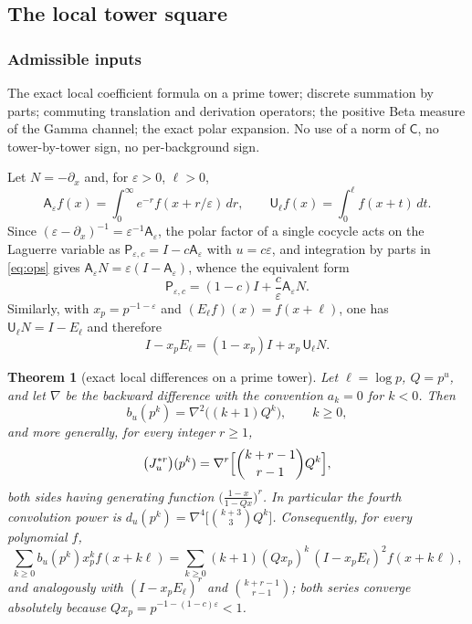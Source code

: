 \documentclass[11pt]{amsart}
\newtheorem{theorem}{Theorem}[section]
\theoremstyle{definition}
\theoremstyle{remark}
\theoremstyle{definition}
\newcommand{\eps}{\varepsilon}
\newcommand{\Pp}{\mathsf{P}}
\newcommand{\Cc}{\mathsf{C}}
\newcommand{\Uu}{\mathsf{U}}
\newcommand{\Aa}{\mathsf{A}}
\begin{document}
\subsection{The local tower square}\label{sec:tower}

\subsubsection*{Admissible inputs}
The exact local coefficient formula on a prime tower; discrete summation by parts; commuting
translation and derivation operators; the positive Beta measure of the Gamma channel; the exact
polar expansion. No use of a norm of $\Cc$, no tower-by-tower sign, no per-background sign.

Let $N=-\partial_x$ and, for $\eps>0$, $\ell>0$,
\begin{equation}\label{eq:ops}
   \Aa_\eps f(x)=\int_0^\infty e^{-r}f(x+r/\eps)\,dr,
   \qquad
   \Uu_\ell f(x)=\int_0^\ell f(x+t)\,dt .
\end{equation}
Since $(\eps-\partial_x)^{-1}=\eps^{-1}\Aa_\eps$, the polar factor of a single cocycle acts on the
Laguerre variable as $\Pp_{\eps,c}=I-c\Aa_\eps$ with $u=c\eps$, and integration by parts in
\eqref{eq:ops} gives $\Aa_\eps N=\eps(I-\Aa_\eps)$, whence the equivalent form
\begin{equation}\label{eq:P-form}
   \Pp_{\eps,c}=(1-c)I+\frac{c}{\eps}\Aa_\eps N .
\end{equation}
Similarly, with $x_p=p^{-1-\eps}$ and $(E_\ell f)(x)=f(x+\ell)$, one has
$\Uu_\ell N=I-E_\ell$ and therefore
\begin{equation}\label{eq:B-form}
   I-x_p E_\ell=(1-x_p)I+x_p\,\Uu_\ell N .
\end{equation}

\begin{theorem}[exact local differences on a prime tower]\label{thm:tower-diff}
Let $\ell=\log p$, $Q=p^u$, and let $\nabla$ be the backward difference with the convention
$a_k=0$ for $k<0$. Then
\begin{equation}\label{eq:tower-2}
   b_u(p^k)=\nabla^2\bigl((k+1)Q^k\bigr),\qquad k\ge0,
\end{equation}
and more generally, for every integer $r\ge1$,
\begin{equation}\label{eq:tower-r}
   \bigl(J_u^{*r}\bigr)(p^k)=\nabla^r\Bigl[\binom{k+r-1}{r-1}Q^k\Bigr],
\end{equation}
both sides having generating function $\bigl(\tfrac{1-x}{1-Qx}\bigr)^r$. In particular the fourth
convolution power is $d_u(p^k)=\nabla^4\bigl[\binom{k+3}{3}Q^k\bigr]$. Consequently, for every
polynomial $f$,
\begin{equation}\label{eq:tower-sum}
   \sum_{k\ge0}b_u(p^k)x_p^kf(x+k\ell)
   =\sum_{k\ge0}(k+1)(Qx_p)^k\,(I-x_p E_\ell)^2f(x+k\ell),
\end{equation}
and analogously with $(I-x_p E_\ell)^r$ and $\binom{k+r-1}{r-1}$; both series converge absolutely
because $Qx_p=p^{-1-(1-c)\eps}<1$.
\end{theorem}
\end{document}
